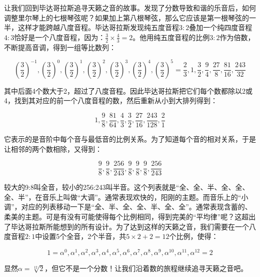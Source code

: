 \documentclass[b5paper]{ctexart}
\begin{document}
\vspace{3mm}
让我们回到毕达哥拉斯追寻天籁之音的故事。发现了分数导致和谐的乐音后，如何调整里尔琴上的七根琴弦呢？如果加上第八根琴弦，那么它应该是第一根琴弦的一半，这样才能跨越八度音程。毕达哥拉斯发现纯五度音程$3:2$叠加一个纯四度音程$4:3$恰好是一个八度音程，因为：$\frac{3}{2} \times \frac{4}{3} = 2$。他用纯五度音程的比例$3:2$作为倍数，不断提高音调，得到一组等比数列：

\[
(\frac{3}{2})^{-1}, (\frac{3}{2})^0, (\frac{3}{2})^{1}, (\frac{3}{2})^2, (\frac{3}{2})^{3}, (\frac{3}{2})^4, (\frac{3}{2})^{5} = \frac{2}{3}, 1, \frac{3}{2}, \frac{9}{4}, \frac{27}{8}, \frac{81}{16}, \frac{243}{32}
\]

其中后面4个数大于2，超过了八度音程。因此毕达哥拉斯把它们每个数都除以2或4，找到其对应的前一个八度音程的数，然后重新从小到大排列得到：

\[
1, \frac{9}{8}, \frac{81}{64}, \frac{4}{3}, \frac{3}{2}, \frac{27}{16}, \frac{243}{128}, \frac{2}{1}
\]

它表示的是音阶中每个音与最低音的比例关系。为了知道每个音的相对关系，于是让相邻的两个数相除，又得到：

\[
\frac{9}{8}, \frac{9}{8}, \frac{256}{243}, \frac{9}{8}, \frac{9}{8}, \frac{9}{8}, \frac{256}{243}
\]

较大的9:8叫全音，较小的256:243叫半音。这个列表就是“全、全、半、全、全、全、半”，在音乐上叫做“大调”。通常表现欢快的，阳刚的主题。而音乐上的“小调”，对应的列表移动一下是“全、半、全、全、半、全、全”。通常表现含蓄的、柔美的主题。可是有没有可能使得每个比例相同，得到完美的“平均律”呢？这超出了毕达哥拉斯所能想到的所有设计。为了达到这样的天籁之音，我们需要在一个八度音程$2:1$中设置5个全音，2个半音，共$5 \times 2 + 2 = 12$个比例，使得：

\[
1 = \alpha^0, \alpha^1, \alpha^2, \alpha^3, \alpha^4, \alpha^5, \alpha^6, \alpha^7, \alpha^8, \alpha^9, \alpha^{10}, \alpha^{11}, \alpha^{12} = 2
\]

显然$\alpha = \sqrt[12]{2}$，但它不是一个分数！让我们沿着数的旅程继续追寻天籁之音吧。
\end{document}
